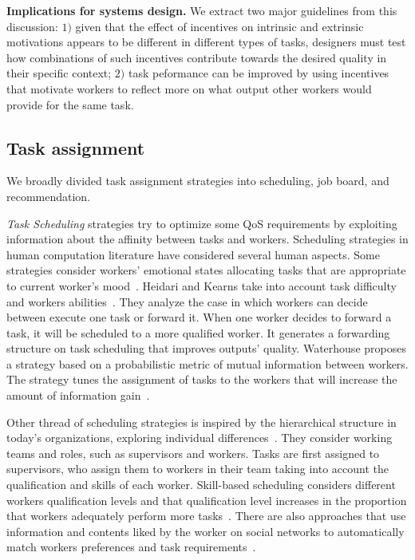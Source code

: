 \documentclass[11pt]{bmc_article_s50}
\begin{document}
\textbf{Implications for systems design.} We extract two major guidelines from this discussion: $1)$ given that the effect of incentives on intrinsic and extrinsic motivations appears to be different in different types of tasks, designers must test how combinations of such incentives contribute towards the desired quality in their specific context; $2)$ task peformance can be improved by using incentives that motivate workers to reflect more on what output other workers would provide for the same task.

\subsection{Task assignment}

We broadly divided task assignment strategies into scheduling, job board, and recommendation.

\textit{Task Scheduling} strategies try to optimize some QoS requirements by exploiting information about the affinity between tasks and workers. Scheduling strategies in human computation literature have considered several human aspects. Some strategies consider workers' emotional states allocating tasks that are appropriate to current worker's mood~\cite{Morris:2011}. {\color{black}Heidari and Kearns take into account task difficulty and workers abilities~\cite{Heidari:2013}. They  analyze the case in which workers can decide between execute one task or forward it. When one worker decides to forward a task, it will be scheduled to a more qualified worker. It generates a forwarding structure on task scheduling that improves outputs' quality. Waterhouse proposes a strategy based on a probabilistic metric of mutual information between workers. The strategy tunes the assignment of tasks to the workers that will increase the amount of information gain~\cite{Waterhouse:2013}.}

Other thread of scheduling strategies is inspired by the hierarchical structure in today's organizations, exploring individual differences~\cite{Noronha:2011,Schallwwwj:2012}. They consider working teams and roles, such as supervisors and workers. Tasks are first assigned to supervisors, who assign them to workers in their team taking into account the qualification and skills of each worker. Skill-based scheduling considers different workers qualification levels and that qualification level increases in the proportion that workers adequately perform more tasks~\cite{Satzger:2011}. There are also approaches that use information and contents liked by the worker on social networks to automatically match workers preferences and task requirements~\cite{Difallah:www:2013}.
\end{document}
